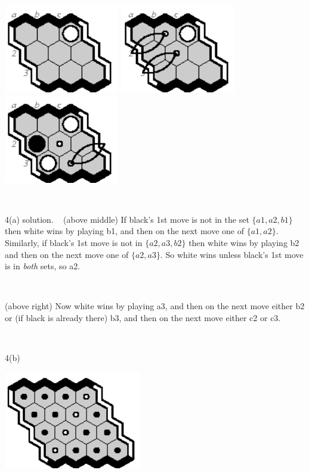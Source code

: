 \documentclass[12pt]{article}
\begin{document}
\newpage
\noindent
\includegraphics[width=50mm]{fz/pix/3strat.eps}\
\includegraphics[width=50mm]{fz/pix/3strat0.eps}\
\includegraphics[width=50mm]{fz/pix/3strat1.eps}

~

4(a) solution. ~
(above middle)
If black's 1st move is not in the set $\{a1,a2,b1\}$ then
white wins by playing b1, and then on the next move
one of $\{a1,a2\}$. Similarly, if black's 1st move is not
in $\{a2,a3,b2\}$ then white wins by playing b2
and then on the next move one of $\{a2,a3\}$.
So white wins unless black's 1st move is in {\em both} sets, so a2.

~

(above right)
Now white wins by playing a3, and then on the next move
either b2 or (if black is already there) b3, and then 
on the next move either c2 or c3.

~

4(b)
\begin{center}
\includegraphics[width=60mm]{fz/pix/4x4.winners.eps}\
\end{center}
\end{document}
